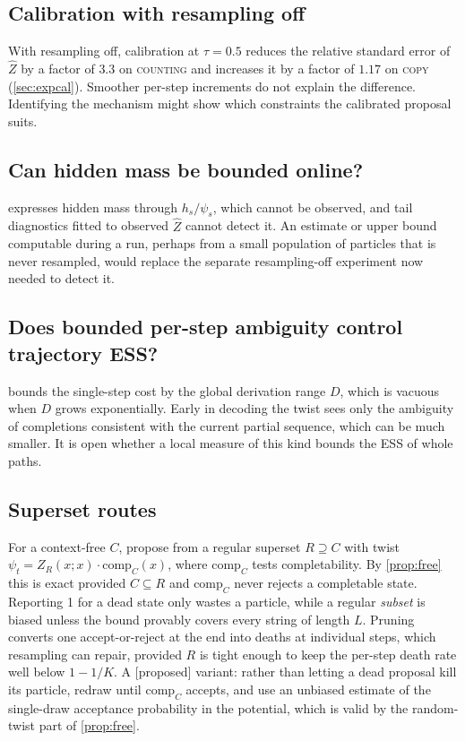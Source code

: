 \documentclass[11pt]{article}
\theoremstyle{definition}
\newcommand{\Zh}{\widehat Z}
\newcommand{\status}[1]{\textsf{\small[#1]}}
\begin{document}
\subsection{Calibration with resampling off}
With resampling off, calibration at $\tau=0.5$ reduces the relative standard error of $\Zh$ by a factor of $3.3$
on \textsc{counting} and increases it by a factor of $1.17$ on \textsc{copy} (\cref{sec:expcal}). Smoother
per-step increments do not explain the difference. Identifying the mechanism might show which constraints the
calibrated proposal suits.

\subsection{Can hidden mass be bounded online?}
 expresses hidden mass through $h_s/\psi_s$, which cannot be observed, and tail diagnostics
fitted to observed $\Zh$ cannot detect it. An estimate or upper bound computable during a run, perhaps from a
small population of particles that is never resampled, would replace the separate resampling-off experiment now
needed to detect it.

\subsection{Does bounded per-step ambiguity control trajectory ESS?}
 bounds the single-step cost by the global derivation range $D$, which is vacuous when $D$ grows
exponentially. Early in decoding the twist sees only the ambiguity of completions consistent with the current
partial sequence, which can be much smaller. It is open whether a local measure of this kind bounds the ESS of
whole paths.

\subsection{Superset routes}
For a context-free $C$, propose from a regular superset $R\supseteq C$ with twist
$\psi_t=Z_R(x;x)\cdot\mathrm{comp}_C(x)$, where $\mathrm{comp}_C$ tests completability. By \cref{prop:free} this
is exact provided $C\subseteq R$ and $\mathrm{comp}_C$ never rejects a completable state. Reporting 1 for a
dead state only wastes a particle, while a regular \emph{subset} is biased unless the bound provably covers every
string of length $L$. Pruning converts one accept-or-reject at the end into deaths at individual steps, which
resampling can repair, provided $R$ is tight enough to keep the per-step death rate well below $1-1/K$.
A \status{proposed} variant: rather than letting a dead proposal kill its particle, redraw until
$\mathrm{comp}_C$ accepts, and use an unbiased estimate of the single-draw acceptance probability in the
potential, which is valid by the random-twist part of \cref{prop:free}.
\end{document}
